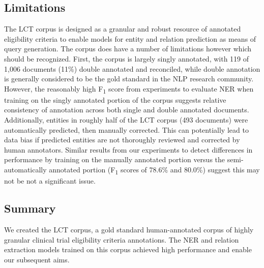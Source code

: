 \documentclass[../main.tex]{subfiles}
\begin{document}
\subsection{Limitations}
The LCT corpus is designed as a granular and robust resource of annotated eligibility criteria to enable models for entity and relation prediction as means of query generation. The corpus does have a number of limitations however which should be recognized. First, the corpus is largely singly annotated, with 119 of 1,006 documents (11\%) double annotated and reconciled, while double annotation is generally considered to be the gold standard in the NLP research community. However, the reasonably high F\textsubscript{1} score from experiments to evaluate NER when training on the singly annotated portion of the corpus suggests relative consistency of annotation across both single and double annotated documents. Additionally, entities in roughly half of the LCT corpus (493 documents) were automatically predicted, then manually corrected. This can potentially lead to data bias if predicted entities are not thoroughly reviewed and corrected by human annotators. Similar results from our experiments to detect differences in performance by training on the manually annotated portion versus the semi-automatically annotated portion (F\textsubscript{1} scores of 78.6\% and 80.0\%) suggest this may not be not a significant issue.

\subsection{Summary}
We created the LCT corpus, a gold standard human-annotated corpus of highly granular clinical trial eligibility criteria annotations. The NER and relation extraction models trained on this corpus achieved high performance and enable our subsequent aims.
\end{document}
